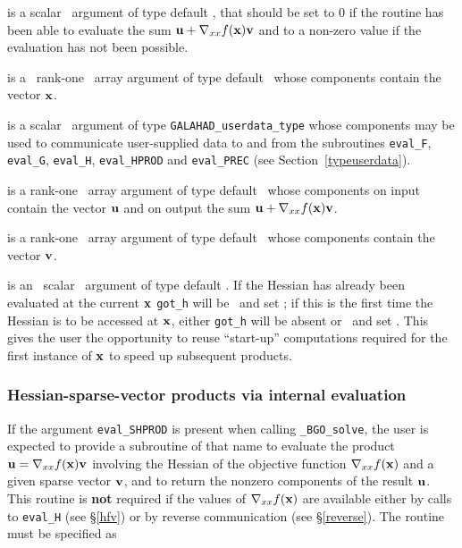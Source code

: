 \documentclass{galahad}
\newcommand{\packagename}{BGO}
\newcommand{\fullpackagename}{\libraryname\_\packagename}
\newcommand{\solver}{{\tt \fullpackagename\_solve}}
\begin{document}
\begin{description}
 is a scalar \intentout\ argument of type default \integer,
that should be set to 0 if the routine has been able to evaluate the
sum ${\mathbf{u}} + \nabla_{xx} f({\mathbf{x}}) {\mathbf{v}}$
and to a non-zero value if the evaluation has not been possible.

 is a \ rank-one \intentin\ array argument of type
default \realdp\ whose components contain the vector ${\mathbf{x}}$.

 is a scalar \intentinout\ argument of type
{\tt GALAHAD\_userdata\_type} whose components may be used
to communicate user-supplied data to and from the
subroutines {\tt eval\_F}, {\tt eval\_G},
{\tt eval\_H}, {\tt eval\_HPROD} and {\tt eval\_PREC}
(see Section~\ref{typeuserdata}).

 is a rank-one \intentinout\ array argument of type default \realdp\
whose components on input contain the vector ${\mathbf{u}}$ and on output the
sum ${\mathbf{u}} + \nabla_{xx} f({\mathbf{x}}) {\mathbf{v}}$.

 is a rank-one \intentin\ array argument of type default \realdp\
whose components contain the vector ${\mathbf{v}}$.

 is an \optional\ scalar \intentin\ argument of type default
\logical. If the Hessian has already been evaluated at the current ${\mathbf{x}}$
{\tt got\_h} will be \present\ and set \true; if this is the first time
the Hessian is to be accessed at ${\mathbf{x}}$, either {\tt got\_h} will be absent
or \present\ and set \false. This gives the user the opportunity
to reuse ``start-up'' computations required for the first instance of
${\mathbf{x}}$ to speed up subsequent products.

\end{description}


\subsubsection{Hessian-sparse-vector products via internal evaluation\label{hvsv}}

If the argument {\tt eval\_SHPROD} is present when calling \solver, the
user is expected to provide a subroutine of that name to evaluate the
product ${\mathbf{u}} = \nabla_{xx} f({\mathbf{x}}) {\mathbf{v}}$ involving 
the Hessian of the objective function $\nabla_{xx} f({\mathbf{x}})$
and a given sparse vector ${\mathbf{v}}$, and to return the nonzero components 
of the result ${\mathbf{u}}$. 
This routine is {\bf not} required if the values of $\nabla_{xx} f({\mathbf{x}})$ are 
available either by calls to {\tt eval\_H} (see \S\ref{hfv})
or by reverse communication (see \S\ref{reverse}).
The routine must be specified as
\end{document}
